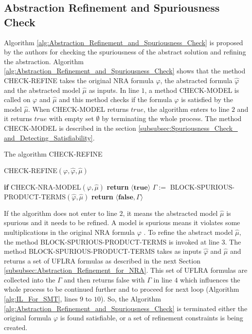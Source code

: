 \subsection{Abstraction Refinement and Spuriousness Check}
\label{subsec:Abstraction_Refinement_and_Spuriousness_Check}
Algorithm \ref{alg:Abstraction_Refinement_and_Spuriousness_Check} is proposed by the authors for checking the spuriousness of the abstract solution and refining the abstraction.
Algorithm \ref{alg:Abstraction_Refinement_and_Spuriousness_Check} shows that the method CHECK-REFINE takes the original NRA formula $\varphi$, the abstracted formula $\hat{\varphi}$ and the abstracted model $\hat{\mu}$ as inputs.
In line $1$, a method CHECK-MODEL is called on $\varphi$ and $\hat{\mu}$ and this method checks if the formula $\varphi$ is satisfied by the model $\hat{\mu}$.
When CHECK-MODEL returns $true$, the algorithm enters to line $2$ and it returns $true$ with empty set $\emptyset$ by terminating the whole process.
The method CHECK-MODEL is described in the section \ref{subsubsec:Spuriousness_Check_ and_Detecting_Satisfiability}.\newline

\begin{algorithm}
\caption{The algorithm CHECK-REFINE \cite{Cimatti:2018:ILS:3274693.3230639}} 
\label{alg:Abstraction_Refinement_and_Spuriousness_Check}
CHECK-REFINE$(\varphi, \hat{\varphi}, \hat{\mu})$
\begin{algorithmic}[1]
\State \textbf{if} CHECK-NRA-MODEL$(\varphi, \hat{\mu})$
\State \hspace{5mm}\textbf{return} $\langle \textbf{true} \rangle$
\State $\Gamma := $ BLOCK-SPURIOUS-PRODUCT-TERMS$(\hat{\varphi}, \hat{\mu})$
\State \textbf{return} $\langle \textbf{false}, \Gamma \rangle$
\end{algorithmic}
\end{algorithm}

\noindent If the algorithm does not enter to line $2$, it means the abstracted model $\hat{\mu}$ is spurious and it needs to be refined.
A model is spurious means it violates some multiplications in the original NRA formula $\varphi$ \cite{Cimatti:2018:ILS:3274693.3230639}.
To refine the abstract model $\hat{\mu}$, the method  BLOCK-SPURIOUS-PRODUCT-TERMS is invoked at line $3$.
The method BLOCK-SPURIOUS-PRODUCT-TERMS takes as inputs $\hat{\varphi}$ and $\hat{\mu}$ and returns a set of UFLRA formulas as described in the next Section \ref{subsubsec:Abstraction_Refinement_for_NRA}.
This set of UFLRA formulas are collected into the $\Gamma$ and then returns false with $\Gamma$ in line $4$ which influences the whole process to be continued further and to proceed for next loop (Algorithm \ref{alg:IL_For_SMT}, lines $9$ to $10$).
So, the Algorithm \ref{alg:Abstraction_Refinement_and_Spuriousness_Check} is terminated either the original formula $\varphi$ is found satisfiable, or a set of refinement constraints is being created.\newline

